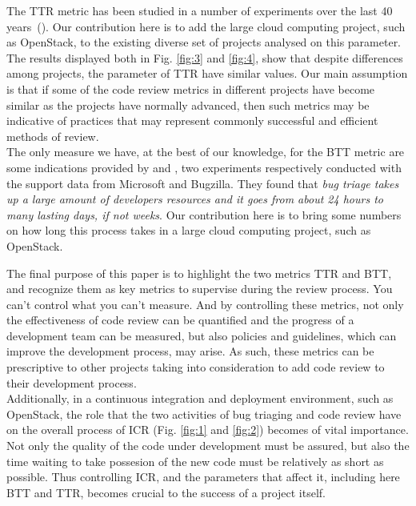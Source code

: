 \documentclass[10pt, conference]{IEEEtran}
\begin{document}
The TTR metric has been studied in a number of experiments over the
last 40 years~(\cite{bib2,bib18,bib23}). 
Our contribution here is to add the large cloud computing project, such as OpenStack, 
to the existing diverse set of projects analysed on this parameter.
\\
The results displayed both in Fig. \ref{fig:3} and \ref{fig:4}, show that 
despite differences among projects, the parameter of TTR have similar values.
Our main assumption is that if some of the code review metrics  
in different projects have become similar as the projects have  
normally advanced, then such metrics may be indicative of  
practices that may represent commonly successful and efficient  
methods of review.
\\
The only measure we have, at the best of our knowledge, for the BTT metric are some indications 
provided by \cite{bib18} and \cite{bib24}, two experiments respectively conducted with the support 
data from Microsoft and Bugzilla. They found that 
\emph{bug triage takes up a large amount of developers resources and it goes from about 24 hours to 
many lasting days, if not weeks}. Our contribution here is to bring some numbers on how long this process 
takes in a large cloud computing project, such as OpenStack.

The final purpose of this paper is to highlight the two metrics TTR and BTT, and recognize them as key metrics to 
supervise during the review process. You can't control what you can't measure.
And by controlling these metrics, not only the effectiveness of code review can be quantified and the progress of 
a development team can be measured, but also policies and guidelines, which can improve the development process, 
may arise.
As such, these metrics can be prescriptive to other projects taking into consideration to add code review to 
their development process. 
\\Additionally, in a continuous integration and deployment environment, such as OpenStack, 
the role that the two activities of bug triaging and code review have on the overall process of ICR (Fig. \ref{fig:1} 
and \ref{fig:2}) becomes of vital importance. Not only the quality of the code under development must be assured, 
but also the time waiting to take possesion of the new code must be relatively as short as possible. 
Thus controlling ICR, and the parameters that affect it, including here BTT and TTR, becomes crucial to the success of 
a project itself.
 
\end{document}
